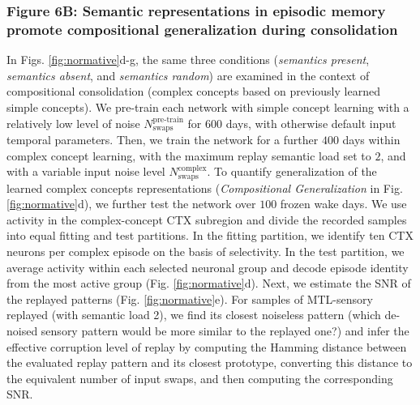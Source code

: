 \documentclass{article}
\begin{document}
\subsubsection*{Figure 6B: Semantic representations in episodic memory promote compositional generalization during consolidation}
In Figs. \ref{fig:normative}d-g, the same three conditions (\textit{semantics present}, \textit{semantics absent}, and \textit{semantics random}) are examined in the context of compositional consolidation (complex concepts based on previously learned simple concepts). We pre-train each network with simple concept learning with a relatively low level of noise $N_\textrm{swaps}^\textrm{pre-train}$ for 600 days, with otherwise default input temporal parameters. Then,  we train the network for a further $400$ days within complex concept learning, with the maximum replay semantic load set to $2$, and with a variable input noise level $N_\textrm{swaps}^\textrm{complex}$.
\newline\newline
To quantify generalization of the learned complex concepts representations (\textit{Compositional Generalization} in Fig. \ref{fig:normative}d), we further test the network over $100$ frozen wake days. We use activity in the complex-concept CTX subregion and divide the recorded samples into equal fitting and test partitions. In the fitting partition, we identify ten CTX neurons per complex episode on the basis of selectivity. In the test partition, we average activity within each selected neuronal group and decode episode identity from the most active group (Fig. \ref{fig:normative}d).
\newline\newline
Next, we estimate the SNR of the replayed patterns (Fig. \ref{fig:normative}e). For samples of MTL-sensory replayed (with semantic load 2), we find its closest noiseless pattern (which de-noised sensory pattern would be more similar to the replayed one?) and infer the effective corruption level of replay by computing the Hamming distance between the evaluated replay pattern and its closest prototype, converting this distance to the equivalent number of input swaps, and then computing the corresponding SNR.
\newline\newline
\end{document}
